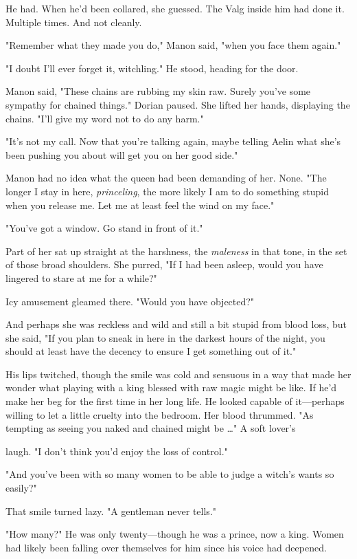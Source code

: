He had. When he'd been collared, she guessed. The Valg inside him had done it. Multiple times. And not cleanly.

"Remember what they made you do," Manon said, "when you face them again."

"I doubt I'll ever forget it, witchling." He stood, heading for the door.

Manon said, "These chains are rubbing my skin raw. Surely you've some sympathy for chained things." Dorian paused. She lifted her hands, displaying the chains. "I'll give my word not to do any harm."

"It's not my call. Now that you're talking again, maybe telling Aelin what she's been pushing you about will get you on her good side."

Manon had no idea what the queen had been demanding of her. None. "The longer I stay in here, \emph{princeling}, the more likely I am to do something stupid when you release me. Let me at least feel the wind on my face."

"You've got a window. Go stand in front of it."

Part of her sat up straight at the harshness, the \emph{maleness} in that tone, in the set of those broad shoulders. She purred, "If I had been asleep, would you have lingered to stare at me for a while?"

Icy amusement gleamed there. "Would you have objected?"

And perhaps she was reckless and wild and still a bit stupid from blood loss, but she said, "If you plan to sneak in here in the darkest hours of the night, you should at least have the decency to ensure I get something out of it."

His lips twitched, though the smile was cold and sensuous in a way that made her wonder what playing with a king blessed with raw magic might be like. If he'd make her beg for the first time in her long life. He looked capable of it---perhaps willing to let a little cruelty into the bedroom. Her blood thrummed. "As tempting as seeing you naked and chained might be \ldots" A soft lover's

laugh. "I don't think you'd enjoy the loss of control."

"And you've been with so many women to be able to judge a witch's wants so easily?"

That smile turned lazy. "A gentleman never tells."

"How many?" He was only twenty---though he was a prince, now a king. Women had likely been falling over themselves for him since his voice had deepened.

